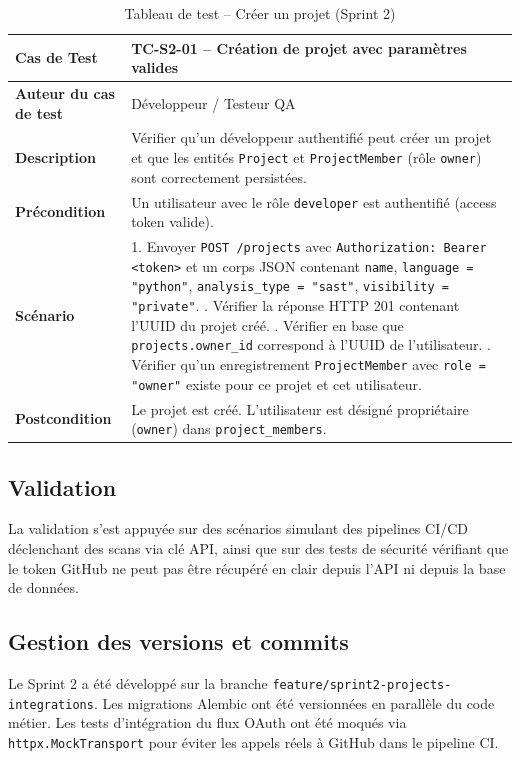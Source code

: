 \begin{table}[H]
\centering
\caption{Tableau de test -- Créer un projet (Sprint 2)}
\label{tab:test-sprint2}
\small
\renewcommand{\arraystretch}{1.3}
\begin{tabularx}{\textwidth}{>{\bfseries}p{3.5cm} X}
\hline
Cas de Test & TC-S2-01 -- Création de projet avec paramètres valides \\
\hline
Auteur du cas de test & Développeur / Testeur QA \\
\hline
Description & Vérifier qu'un développeur authentifié peut créer un projet et que les entités \texttt{Project} et \texttt{ProjectMember} (rôle \texttt{owner}) sont correctement persistées. \\
\hline
Précondition & Un utilisateur avec le rôle \texttt{developer} est authentifié (access token valide). \\
\hline
Scénario &
1. Envoyer \texttt{POST /projects} avec \texttt{Authorization: Bearer <token>} et un corps JSON contenant \texttt{name}, \texttt{language = "python"}, \texttt{analysis\_type = "sast"}, \texttt{visibility = "private"}. \newline
2. Vérifier la réponse HTTP 201 contenant l'UUID du projet créé. \newline
3. Vérifier en base que \texttt{projects.owner\_id} correspond à l'UUID de l'utilisateur. \newline
4. Vérifier qu'un enregistrement \texttt{ProjectMember} avec \texttt{role = "owner"} existe pour ce projet et cet utilisateur. \\
\hline
Postcondition & Le projet est créé. L'utilisateur est désigné propriétaire (\texttt{owner}) dans \texttt{project\_members}. \\
\hline
\end{tabularx}
\end{table}

\subsection{Validation}
La validation s'est appuyée sur des scénarios simulant des pipelines CI/CD déclenchant des scans via clé API, ainsi que sur des tests de sécurité vérifiant que le token GitHub ne peut pas être récupéré en clair depuis l'API ni depuis la base de données.

\subsection{Gestion des versions et commits}
Le Sprint 2 a été développé sur la branche \texttt{feature/sprint2-projects-integrations}. Les migrations Alembic ont été versionnées en parallèle du code métier. Les tests d'intégration du flux OAuth ont été moqués via \texttt{httpx.MockTransport} pour éviter les appels réels à GitHub dans le pipeline CI.

